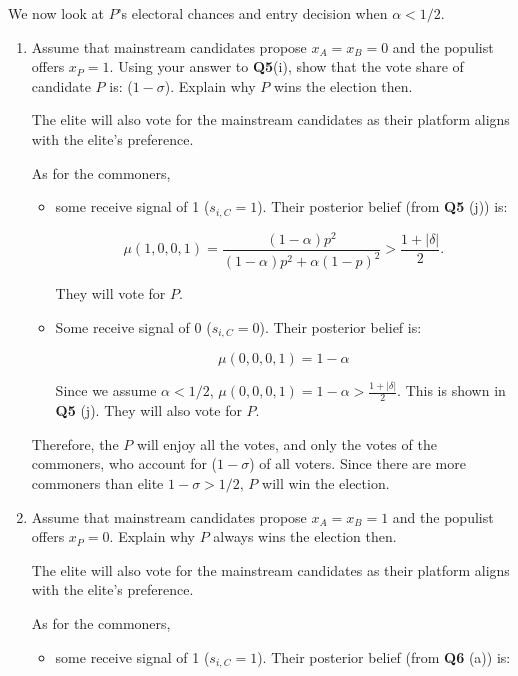 \documentclass[
  letterpaper,
  abstract=true]{scrartcl}
\begin{document}
We now look at \(P\)'s electoral chances and entry decision when
\(\alpha<1/2\).

\begin{enumerate}
\def\labelenumi{(\alph{enumi})}
\item
  Assume that mainstream candidates propose \(x_A=x_B=0\) and the
  populist offers \(x_P=1\). Using your answer to \textbf{Q5}(i), show
  that the vote share of candidate \(P\) is: (\(1 − \sigma\)). Explain
  why \(P\) wins the election then.

  \color{blue}

  The elite will also vote for the mainstream candidates as their
  platform aligns with the elite's preference.

  As for the commoners,

  \begin{itemize}
  \item
    some receive signal of 1 (\(s_{i,C}=1\)). Their posterior belief
    (from \textbf{Q5} (j)) is:

    \[
    \mu(1,0,0,1)=\frac{(1-\alpha)p^2}{(1-\alpha)p^2+\alpha(1-p)^2}>\frac{1+|\delta|}{2}.
    \]

    They will vote for \(P\).
  \item
    Some receive signal of 0 (\(s_{i,C}=0\)). Their posterior belief is:

    \[
    \mu(0,0,0,1)=1-\alpha
    \]

    Since we assume \(\alpha<1/2\),
    \(\mu(0,0,0,1)=1-\alpha>\frac{1+|\delta|}{2}\). This is shown in
    \textbf{Q5} (j). They will also vote for \(P\).
  \end{itemize}

  Therefore, the \(P\) will enjoy all the votes, and only the votes of
  the commoners, who account for (\(1-\sigma\)) of all voters. Since
  there are more commoners than elite \(1-\sigma>1/2\), \(P\) will win
  the election.

  \color{black}
\item
  Assume that mainstream candidates propose \(x_A=x_B=1\) and the
  populist offers \(x_P=0\). Explain why \(P\) always wins the election
  then.

  \color{blue}

  The elite will also vote for the mainstream candidates as their
  platform aligns with the elite's preference.

  As for the commoners,

  \begin{itemize}
  \item
    some receive signal of 1 (\(s_{i,C}=1\)). Their posterior belief
    (from \textbf{Q6} (a)) is:


\end{itemize}
\end{enumerate}
\end{document}
